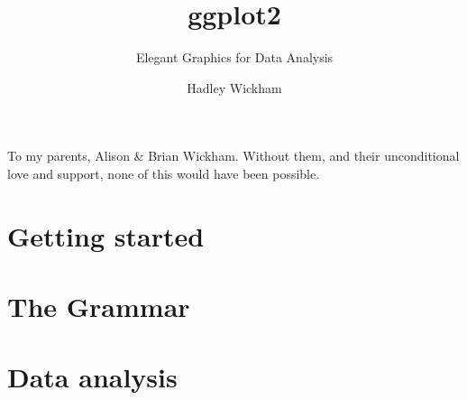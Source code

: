\documentclass[graybox,envcountchap,sectrefs]{svmono}
\title{ggplot2}
\subtitle{Elegant Graphics for Data Analysis}
\author{Hadley Wickham}
\let\oldhyperlink=\hyperlink
\renewcommand{\hyperlink}[2]{\autoref{#1}}
\begin{document}
\frontmatter
\maketitle

\begin{dedication}
To my parents, Alison \& Brian Wickham. Without them, and their unconditional
love and support, none of this would have been possible.
\end{dedication}



\tableofcontents

\mainmatter

\part{Getting started}





\part{The Grammar}







\part{Data analysis}






\backmatter

\let\hyperlink=\oldhyperlink %
\cleardoublepage
{}
\printindex

\printindex[code]
\end{document}
